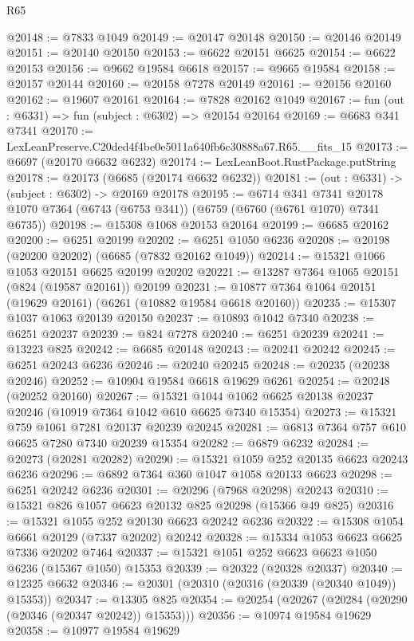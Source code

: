 \begin{lexlean}{R65}
\begin{coremodule}
{@20148 := @7833 @1049
@20149 := @20147 @20148
@20150 := @20146 @20149
@20151 := @20140 @20150
@20153 := @6622 @20151 @6625
@20154 := @6622 @20153
@20156 := @9662 @19584 @6618
@20157 := @9665 @19584
@20158 := @20157 @20144
@20160 := @20158 @7278 @20149
@20161 := @20156 @20160
@20162 := @19607 @20161
@20164 := @7828 @20162 @1049
@20167 := fun (out : @6331) => fun (subject : @6302) => @20154 @20164
@20169 := @6683 @341 @7341
@20170 := LexLeanPreserve.C20ded4f4be0e5011a640fb6c30888a67.R65.__fits_15
@20173 := @6697 (@20170 @6632 @6232)
@20174 := LexLeanBoot.RustPackage.putString
@20178 := @20173 (@6685 (@20174 @6632 @6232))
@20181 := (out : @6331) -> (subject : @6302) -> @20169 @20178
@20195 := @6714
    @341
    @7341
    @20178
    @1070
    @7364
    (@6743 (@6753 @341))
    (@6759 (@6760 (@6761 @1070) @7341 @6735))
@20198 := @15308 @1068 @20153 @20164
@20199 := @6685 @20162
@20200 := @6251 @20199
@20202 := @6251 @1050 @6236
@20208 := @20198 (@20200 @20202) (@6685 (@7832 @20162 @1049))
@20214 := @15321 @1066 @1053 @20151 @6625 @20199 @20202
@20221 := @13287 @7364 @1065 @20151 (@824 (@19587 @20161)) @20199
@20231 := @10877 @7364 @1064 @20151 (@19629 @20161) (@6261 (@10882 @19584 @6618 @20160))
@20235 := @15307 @1037 @1063 @20139 @20150
@20237 := @10893 @1042 @7340
@20238 := @6251 @20237
@20239 := @824 @7278
@20240 := @6251 @20239
@20241 := @13223 @825
@20242 := @6685 @20148
@20243 := @20241 @20242
@20245 := @6251 @20243 @6236
@20246 := @20240 @20245
@20248 := @20235 (@20238 @20246)
@20252 := @10904 @19584 @6618 @19629 @6261
@20254 := @20248 (@20252 @20160)
@20267 := @15321 @1044 @1062 @6625 @20138 @20237 @20246 (@10919 @7364 @1042 @610 @6625 @7340 @15354)
@20273 := @15321 @759 @1061 @7281 @20137 @20239 @20245
@20281 := @6813 @7364 @757 @610 @6625 @7280 @7340 @20239 @15354
@20282 := @6879 @6232
@20284 := @20273 (@20281 @20282)
@20290 := @15321 @1059 @252 @20135 @6623 @20243 @6236
@20296 := @6892 @7364 @360 @1047 @1058 @20133 @6623
@20298 := @6251 @20242 @6236
@20301 := @20296 (@7968 @20298) @20243
@20310 := @15321 @826 @1057 @6623 @20132 @825 @20298 (@15366 @49 @825)
@20316 := @15321 @1055 @252 @20130 @6623 @20242 @6236
@20322 := @15308 @1054 @6661 @20129 (@7337 @20202) @20242
@20328 := @15334 @1053 @6623 @6625 @7336 @20202 @7464
@20337 := @15321 @1051 @252 @6623 @6623 @1050 @6236 (@15367 @1050) @15353
@20339 := @20322 (@20328 @20337)
@20340 := @12325 @6632
@20346 := @20301 (@20310 (@20316 (@20339 (@20340 @1049)) @15353))
@20347 := @13305 @825
@20354 := @20254 (@20267 (@20284 (@20290 (@20346 (@20347 @20242)) @15353)))
@20356 := @10974 @19584 @19629
@20358 := @10977 @19584 @19629
}
\end{coremodule}
\end{lexlean}
